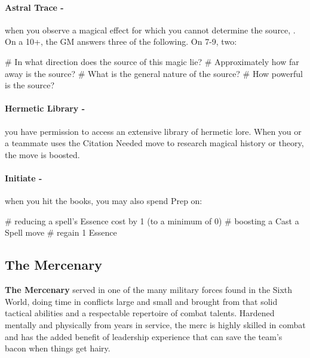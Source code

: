 \paragraph{Astral Trace -} when you observe a magical effect for which you cannot determine the source, . On a 10+, the GM answers three of the following. On 7-9, two:
    \begin{easylist}
        # In what direction does the source of this magic lie?
        # Approximately how far away is the source?
        # What is the general nature of the source?
        # How powerful is the source?
    \end{easylist}

\paragraph{Hermetic Library -} you have permission to access an extensive library of hermetic lore. When you or a teammate uses the Citation Needed move to research magical history or theory, the move is boosted.

\paragraph{Initiate -} when you hit the books, you may also spend Prep on:
    \begin{easylist}
        # reducing a spell’s Essence cost by 1 (to a minimum of 0)
        # boosting a Cast a Spell move
        # regain 1 Essence
    \end{easylist}


\clearpage
\subsection{The Mercenary}
\textbf{The Mercenary} served in one of the many military forces found in the Sixth World, doing time in conflicts large and small and brought from that solid tactical abilities and a respectable repertoire of combat talents. Hardened mentally and physically from years in service, the merc is highly skilled in combat and has the added benefit of leadership experience that can save the team’s bacon when things get hairy.

